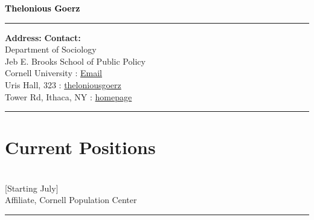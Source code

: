 \documentclass[11pt]{article} %
\begin{document}
\begin{center}
{\Huge\bfseries \textcolor{black}{Thelonious Goerz}} \\
\end{center}
\noindent\rule{16cm}{0.4pt}

\bigskip 

\textbf{Address:} \hfill \textbf{Contact:} \\
Department of Sociology \\
Jeb E. Brooks School of Public Policy \\ 
Cornell University \hfill {} : \href{mailto:theloniouslgoerz@gmail.com}{Email}\\ %
Uris Hall, 323  \hfill {} : \href{https://github.com/theloniousgoerz/}{theloniousgoerz}\\ %
Tower Rd, Ithaca, NY \hfill {} : \href{theloniousgoerz.github.io}{homepage} \\
\noindent\rule{16cm}{0.4pt}

\vspace{0.001\textheight} %





\section*{Current Positions}

 \\

 [Starting July] \\
\hspace*{10mm} Affiliate, Cornell Population Center \\
\noindent\rule{16cm}{0.4pt}
\end{document}
